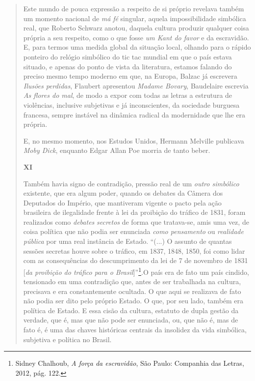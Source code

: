 \begin{quote}
Este mundo de pouca expressão a respeito de si próprio revelava também
um momento nacional de \emph{má} \emph{fé} singular, aquela
impossibilidade simbólica real, que Roberto Schwarz anotou, daquela
cultura produzir qualquer coisa própria a seu respeito, como o que fosse
\emph{um Kant do favor} e da escravidão. E, para termos uma medida
global da situação local, olhando para o rápido ponteiro do relógio
simbólico do tic tac mundial em que o país estava situado, e apenas do
ponto de vista da literatura, estamos falando do preciso mesmo tempo
moderno em que, na Europa, Balzac já escrevera \emph{Ilusões perdidas},
Flaubert apresentou \emph{Madame Bovary}, Baudelaire escrevia \emph{As
flores do mal}, de modo a expor com todas as letras a estrutura de
violências, inclusive subjetivas e já inconscientes, da sociedade
burguesa francesa, sempre instável na dinâmica radical da modernidade
que lhe era própria.

E, no mesmo momento, nos Estudos Unidos, Hermann Melville publicava
\emph{Moby Dick}, enquanto Edgar Allan Poe morria de tanto beber.

\textbf{XI}

Também havia signo de contradição, pressão real de um \emph{outro
simbólico} existente, que era algum poder, quando os debates da Câmera
dos Deputados do Império, que mantiveram vigente o pacto pela ação
brasileira de ilegalidade frente à lei da proibição do tráfico de 1831,
foram realizados como \emph{debates} \emph{secretos} de forma que
tratava-se, amis uma vez, de coisa política que não podia ser enunciada
\emph{como pensamento} ou \emph{realidade pública} por uma real
instância de Estado. ``(...) O assunto de quantas sessões secretas houve
sobre o tráfico, em 1837, 1848, 1850, foi como lidar com as
consequências do descumprimento da lei de 7 de novembro de 1831
{[}\emph{da proibição do tráfico para o Brasil}{]}''\footnote{Sidney
  Chalhoub, \emph{A força da escravidão}, São Paulo: Companhia das
  Letras, 2012, pág. 122.}.O país era de fato um país cindido,
tensionado em uma contradição que, antes de ser trabalhada na cultura,
precisava e era constantemente ocultada. O que aqui se realizava de fato
não podia ser dito pelo próprio Estado. O que, por seu lado, também era
política de Estado. E essa cisão da cultura, estatuto de dupla gestão da
verdade, que é, mas que não pode ser enunciada, ou, que não é, mas de
fato é, é uma das chaves históricas centrais da insolidez da vida
simbólica, subjetiva e política no Brasil.


\end{quote}
